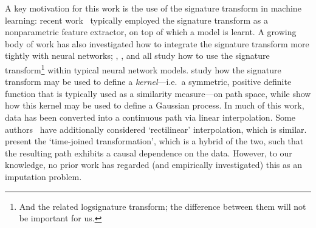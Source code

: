 \documentclass{article}
\begin{document}
A key motivation for this work is the use of the signature transform in
machine learning: recent work~\citep{primer2016,
kormilitzlin2016, yang2016rotation, li2017lpsnet, yang2017leveraging,
PerezArribas2018, morrill2019sepsis} typically employed the signature transform as a nonparametric feature extractor, on top of which
a model is learnt. A growing body of work has also investigated how to
integrate the signature transform more tightly with neural networks; 
\citet{jeremythesis}, \citet{logsigrnn}, and \citet{kidger2019deep} all
study how to use the signature transform\footnote{And the related
logsignature transform; the difference between them will not be
important for us.} within typical neural network models.
\citet{chevyrev2018signature, kiraly2019kernels} study how the signature
transform may be used to define a \emph{kernel}---i.e.\ a symmetric,
positive definite function that is typically used as a similarity
measure---on path space, while \citet{toth2019gp} show how this kernel
may be used to define a Gaussian process.
%
In much of this work, data has been converted into a continuous path via
linear interpolation. Some authors~\citep{primer2016,
fermanian2019embedding} have additionally considered `rectilinear'
interpolation, which is similar. \citet{levin2013} present the
`time-joined transformation', which is a hybrid of the two, such that
the resulting path exhibits a causal dependence on the data.  However,
to our knowledge, no prior work has regarded (and empirically investigated) this as an imputation
problem.
\end{document}
